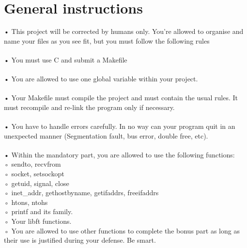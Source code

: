 \documentclass{42-en}
\begin{document}
\chapter{General instructions}

    • This project will be corrected by humans only. You’re allowed to organise and name your files as you see fit, but you must follow the following rules\\
    \\
    • You must use C and submit a Makefile\\
    \\
    • You are allowed to use one global variable within your project.\\
    \\
    • Your Makefile must compile the project and must contain the usual rules. It must recompile and re-link the program only if necessary.\\
    \\
    • You have to handle errors carefully. In no way can your program quit in an unexpected manner (Segmentation fault, bus error, double free, etc).\\
    \\
    • Within the mandatory part, you are allowed to use the following functions:\\

          ◦ sendto, recvfrom\\

          ◦ socket, setsockopt\\  

          ◦ getuid, signal, close\\

          ◦ inet\_addr, gethostbyname, getifaddrs, freeifaddrs\\ 

          ◦ htons, ntohs\\  

          ◦ printf and its family.\\  

          ◦ Your libft functions.\\    

          ◦ You are allowed to use other functions to complete the bonus part as long as their use is justified during your defense. Be smart.\\




\end{document}
